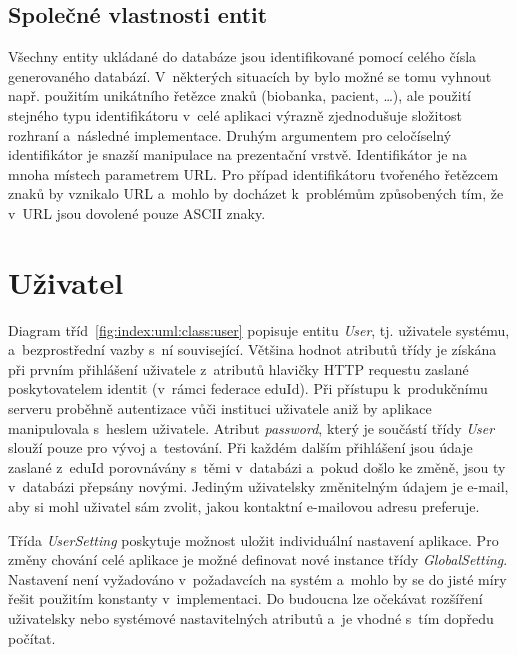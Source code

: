 \documentclass[11pt, final, oneside]{fithesis2}
\begin{document}
\subsection{Společné vlastnosti entit}
Všechny entity ukládané do databáze jsou identifikované pomocí celého čísla generovaného databází. V~některých situacích by bylo možné se tomu vyhnout např. použitím unikátního řetězce znaků (biobanka, pacient, \ldots), ale použití stejného typu identifikátoru v~celé aplikaci výrazně zjednodušuje složitost rozhraní a~následné implementace. Druhým argumentem pro celočíselný identifikátor je snazší manipulace na prezentační vrstvě. Identifikátor je na mnoha místech parametrem URL. Pro případ identifikátoru tvořeného řetězcem znaků by vznikalo  URL a~mohlo by docházet k~problémům způsobených tím, že v~URL jsou dovolené pouze ASCII znaky.

\section{Uživatel}
Diagram tříd~\ref{fig:index:uml:class:user} popisuje entitu \textit{User}, tj. uživatele systému, a~bezprostřední vazby s~ní související. Většina hodnot atributů třídy je získána při prvním přihlášení uživatele z~atributů hlavičky HTTP requestu zaslané poskytovatelem identit (v~rámci federace eduId). Při přístupu k~produkčnímu serveru proběhně autentizace vůči  instituci uživatele aniž by aplikace manipulovala s~heslem uživatele. Atribut \textit{password}, který je součástí třídy \textit{User} slouží pouze pro vývoj a~testování. 
Při každém dalším přihlášení jsou údaje zaslané z~eduId porovnávány s~těmi v~databázi a~pokud došlo ke změně, jsou ty v~databázi přepsány novými. Jediným uživatelsky změnitelným údajem je e-mail, aby si mohl uživatel sám zvolit, jakou kontaktní e-mailovou adresu preferuje.

Třída \textit{UserSetting} poskytuje možnost uložit individuální nastavení aplikace.
Pro změny chování celé aplikace je možné definovat nové instance třídy \textit{GlobalSetting}. Nastavení není vyžadováno v~požadavcích na systém a~mohlo by se do jisté míry řešit použitím konstanty v~implementaci. Do budoucna lze očekávat rozšíření uživatelsky nebo systémové nastavitelných atributů a~je vhodné s~tím dopředu počítat.
\end{document}
